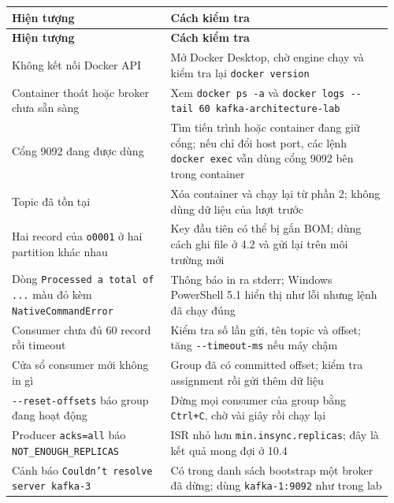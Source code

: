 \begingroup\small
\renewcommand{\arraystretch}{1.2}
\begin{longtable}{@{}p{0.4\linewidth}p{0.56\linewidth}@{}}
\toprule
\rowcolor{rowLavender}
\textbf{Hiện tượng} & \textbf{Cách kiểm tra} \\
\midrule
\endfirsthead
\toprule
\rowcolor{rowLavender}
\textbf{Hiện tượng} & \textbf{Cách kiểm tra} \\
\midrule
\endhead
\bottomrule
\endfoot
Không kết nối Docker API & Mở Docker Desktop, chờ engine chạy và kiểm tra lại \texttt{docker version} \\
Container thoát hoặc broker chưa sẵn sàng & Xem \texttt{docker ps -\allowbreak{}a} và \texttt{docker logs -\allowbreak{}-\allowbreak{}tail 60 kafka-\allowbreak{}architecture-\allowbreak{}lab} \\
Cổng 9092 đang được dùng & Tìm tiến trình hoặc container đang giữ cổng; nếu chỉ đổi host port, các lệnh \texttt{docker exec} vẫn dùng cổng 9092 bên trong container \\
Topic đã tồn tại & Xóa container và chạy lại từ phần 2; không dùng dữ liệu của lượt trước \\
Hai record của \texttt{o0001} ở hai partition khác nhau & Key đầu tiên có thể bị gắn BOM; dùng cách ghi file ở 4.2 và gửi lại trên môi trường mới \\
Dòng \texttt{Processed a total of .\allowbreak{}.\allowbreak{}.\allowbreak{}} màu đỏ kèm \texttt{NativeCommandError} & Thông báo in ra stderr; Windows PowerShell 5.1 hiển thị như lỗi nhưng lệnh đã chạy đúng \\
Consumer chưa đủ 60 record rồi timeout & Kiểm tra số lần gửi, tên topic và offset; tăng \texttt{-\allowbreak{}-\allowbreak{}timeout-\allowbreak{}ms} nếu máy chậm \\
Cửa sổ consumer mới không in gì & Group đã có committed offset; kiểm tra assignment rồi gửi thêm dữ liệu \\
\texttt{-\allowbreak{}-\allowbreak{}reset-\allowbreak{}offsets} báo group đang hoạt động & Dừng mọi consumer của group bằng \texttt{Ctrl+C}, chờ vài giây rồi chạy lại \\
Producer \texttt{acks=\allowbreak{}all} báo \texttt{NOT\_\allowbreak{}ENOUGH\_\allowbreak{}REPLICAS} & ISR nhỏ hơn \texttt{min.\allowbreak{}insync.\allowbreak{}replicas}; đây là kết quả mong đợi ở 10.4 \\
Cảnh báo \texttt{Couldn't resolve server kafka-\allowbreak{}3} & Có trong danh sách bootstrap một broker đã dừng; dùng \texttt{kafka-\allowbreak{}1:9092} như trong lab \\
\end{longtable}
\endgroup

